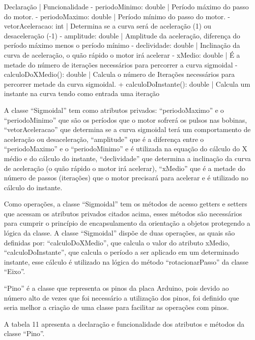 Declaração | Funcionalidade
- periodoMinimo: double | Período máximo do passo do motor.
- periodoMaximo: double | Período mínimo do passo do motor.
- vetorAceleracao: int | Determina se a curva será de aceleração (1) ou desaceleração (-1)
- amplitude: double | Amplitude da aceleração, diferença do período máximo menos o período mínimo
- declividade: double | Inclinação da curva de aceleração, o quão rápido o motor irá acelerar
- xMedio: double | É a metade do número de iterações necessários para percorrer a curva sigmoidal
- calculoDoXMedio(): double | Calcula o número de Iterações necessários para percorrer metade da curva sigmoidal.
+ calculoDoInstante(): double | Calcula um instante na curva tendo como entrada uma iteração

A classe “Sigmoidal” tem como atributos privados: “periodoMaximo” e o “periodoMinimo” que são os períodos 
que o motor sofrerá os pulsos nas bobinas, “vetorAceleracao” que determina se a curva sigmoidal terá 
um comportamento de aceleração ou desaceleração, “amplitude” que é a diferença entre o “periodoMaximo” 
e o “periodoMinimo” e é utilizada na equação do cálculo do X médio e do cálculo do instante, “declividade” 
que determina a inclinação da curva de aceleração (o quão rápido o motor irá acelerar), “xMedio” que é a 
metade do número de passos (iterações) que o motor precisará para acelerar e é utilizado no cálculo do instante. 

Como operações, a classe “Sigmoidal” tem os métodos de acesso getters e setters que acessam os atributos 
privados citados acima, esses métodos são necessários para cumprir o princípio de encapsulamento da orientação 
a objetos protegendo a lógica da classe. A classe “Sigmoidal” dispõe de duas operações, as quais são definidas 
por: “calculoDoXMedio”, que calcula o valor do atributo xMedio, “calculoDoInstante”, que calcula o período a 
ser aplicado em um determinado instante, esse cálculo é utilizado na lógica do método “rotacionarPasso” da classe “Eixo”.

“Pino” é a classe que representa os pinos da placa Arduino, pois devido ao número alto de vezes que foi necessário 
a utilização dos pinos, foi definido que seria melhor a criação de uma classe para facilitar as operações com pinos. 

A tabela 11 apresenta a declaração e funcionalidade dos atributos e métodos da classe “Pino”.



